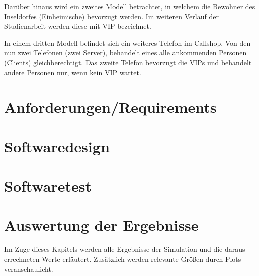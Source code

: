 Darüber hinaus wird ein zweites Modell betrachtet, in welchem die Bewohner des Inseldorfes (Einheimische) bevorzugt werden. Im weiteren Verlauf der Studienarbeit werden diese mit VIP bezeichnet. 

In einem dritten Modell befindet sich ein weiteres Telefon im Callshop. Von den nun zwei Telefonen (zwei Server), behandelt eines alle ankommenden Personen (Clients) gleichberechtigt. Das zweite Telefon bevorzugt die VIPs und behandelt andere Personen nur, wenn kein VIP wartet.

\section{Anforderungen/Requirements}

\section{Softwaredesign}

\section{Softwaretest}

\section{Auswertung der Ergebnisse}
Im Zuge dieses Kapitels werden alle Ergebnisse der Simulation und die daraus errechneten Werte erläutert. Zusätzlich werden relevante Größen durch Plots veranschaulicht.

